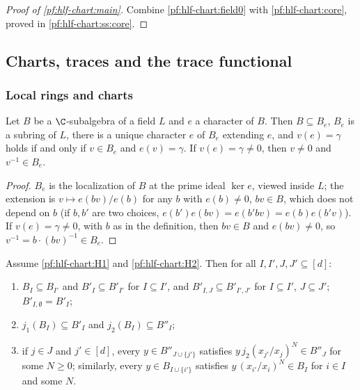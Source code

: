 \begin{proof}[Proof of \cref{pf:hlf-chart:main}]
Combine \cref{pf:hlf-chart:field0} with \cref{pf:hlf-chart:core}, proved in \cref{pf:hlf-chart:ss:core}.
\end{proof}

\subsection{Charts, traces and the trace functional}\label{pf:hlf-chart:ss:forms}

\subsubsection*{Local rings and charts}

\begin{lemma}[Values]\label{pf:hlf-chart:valbasic}
Let $B$ be a $\C$-subalgebra of a field $L$ and $e$ a character of $B$. Then $B\subseteq B_e$, $B_e$ is a subring of $L$, there is a unique
character $e$ of $B_e$ extending $e$, and $v(e)=\gamma$ holds if and only if $v\in B_e$ and $e(v)=\gamma$. If $v(e)=\gamma\ne0$, then $v\ne0$
and $v^{-1}\in B_e$.
\end{lemma}

\begin{proof}
$B_e$ is the localization of $B$ at the prime ideal $\ker e$, viewed inside $L$; the extension is $v\mapsto e(bv)/e(b)$ for any $b$ with
$e(b)\ne0$, $bv\in B$, which does not depend on $b$ (if $b,b'$ are two choices, $e(b')e(bv)=e(b'bv)=e(b)e(b'v)$). If $v(e)=\gamma\ne0$,
with $b$ as in the definition, then $bv\in B$ and $e(bv)\ne0$, so $v^{-1}=b\cdot(bv)^{-1}\in B_e$.
\end{proof}

\begin{lemma}[Charts]\label{pf:hlf-chart:rybasic}
Assume \ref{pf:hlf-chart:H1} and \ref{pf:hlf-chart:H2}. Then for all $I,I',J,J'\subseteq[d]$:
\begin{enumerate}[label=\textup{(\alph*)},nosep]
\item $B_I\subseteq B_{I'}$ and $B'_I\subseteq B'_{I'}$ for $I\subseteq I'$, and $B'_{I,J}\subseteq B'_{I',J'}$ for $I\subseteq I'$, $J\subseteq J'$;
  $B'_{I,\emptyset}=B'_I$;
\item $j_1(B_I)\subseteq B'_I$ and $j_2(B_I)\subseteq B''_I$;
\item if $j\in J$ and $j'\in[d]$, every $y\in B''_{J\cup\{j'\}}$ satisfies $y\,j_2(x_{j'}/x_j)^N\in B''_J$ for some $N\ge0$; similarly, every
  $y\in B_{I\cup\{i'\}}$ satisfies $y\,(x_{i'}/x_i)^N\in B_I$ for $i\in I$ and some $N$.
  \end{enumerate}
\end{lemma}

